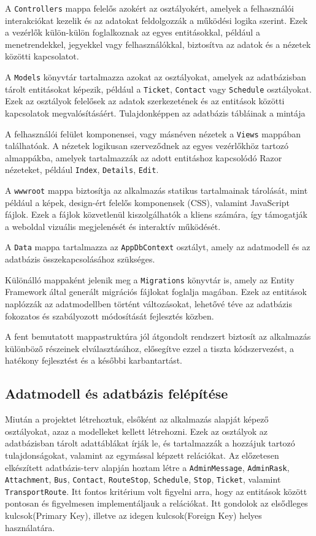 A \texttt{Controllers} mappa felelős azokért az osztályokért, amelyek a felhasználói interakciókat kezelik és az adatokat feldolgozzák a működési logika szerint. Ezek a vezérlők külön-külön foglalkoznak az egyes entitásokkal, például a menetrendekkel, jegyekkel vagy felhasználókkal, biztosítva az adatok és a nézetek közötti kapcsolatot.

A \texttt{Models} könyvtár tartalmazza azokat az osztályokat, amelyek az adatbázisban tárolt entitásokat képezik, például a \texttt{Ticket}, \texttt{Contact} vagy \texttt{Schedule} osztályokat. Ezek az osztályok felelősek az adatok szerkezetének és az entitások közötti kapcsolatok megvalósításáért. Tulajdonképpen az adatbázis tábláinak a mintája

A felhasználói felület komponensei, vagy másnéven nézetek a \texttt{Views} mappában találhatóak. A nézetek logikusan szerveződnek az egyes vezérlőkhöz tartozó almappákba, amelyek tartalmazzák az adott entitáshoz kapcsolódó Razor nézeteket, például \texttt{Index}, \texttt{Details}, \texttt{Edit}.

A \texttt{wwwroot} mappa biztosítja az alkalmazás statikus tartalmainak tárolását, mint például a képek, design-ért felelős komponensek (CSS), valamint JavaScript fájlok. Ezek a fájlok közvetlenül kiszolgálhatók a kliens számára, így támogatják a weboldal vizuális megjelenését és interaktív működését.

A \texttt{Data} mappa tartalmazza az \texttt{AppDbContext} osztályt, amely az adatmodell és az adatbázis összekapcsolásához szükséges.

Különálló mappaként jelenik meg a \texttt{Migrations} könyvtár is, amely az Entity Framework által generált migrációs fájlokat foglalja magában. Ezek az entitások naplózzák az adatmodellben történt változásokat, lehetővé téve az adatbázis fokozatos és szabályozott módosítását fejlesztés közben.

A fent bemutatott mappastruktúra jól átgondolt rendszert biztosít az alkalmazás különböző részeinek elválasztásához, elősegítve ezzel a tiszta kódszervezést, a hatékony fejlesztést és a későbbi karbantartást.

\subsection{Adatmodell és adatbázis felépítése}

Miután a projektet létrehoztuk, elsőként az alkalmazás alapját képező osztályokat, azaz a modelleket kellett létrehozni. Ezek az osztályok az adatbázisban tárolt adattáblákat írják le, és tartalmazzák a hozzájuk tartozó tulajdonságokat, valamint az egymással képzett relációkat. Az előzetesen elkészített adatbázis-terv alapján hoztam létre  a \texttt{AdminMessage}, \texttt{AdminRask}, \texttt{Attachment}, \texttt{Bus}, \texttt{Contact}, \texttt{RouteStop}, \texttt{Schedule}, \texttt{Stop}, \texttt{Ticket}, valamint \texttt{TransportRoute}. Itt fontos kritérium volt figyelni arra, hogy az entitások között pontosan és figyelmesen implementáljauk a relációkat. Itt gondolok az elsődleges kulcsok(Primary Key), illetve az idegen kulcsok(Foreign Key) helyes használatára.

